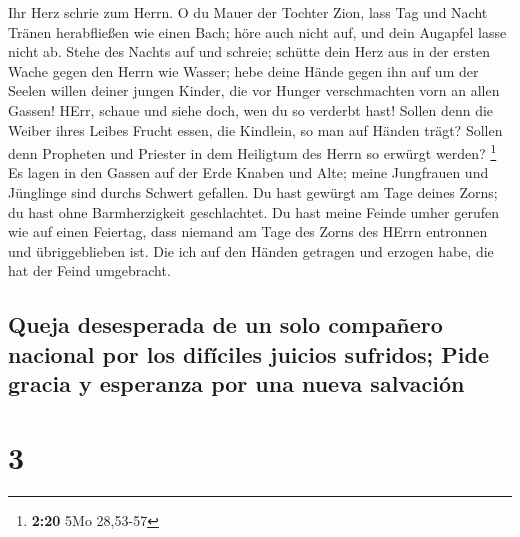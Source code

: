  Ihr Herz schrie zum Herrn. O du Mauer der Tochter Zion,
lass Tag und Nacht Tränen herabfließen wie einen Bach; höre auch nicht
auf, und dein Augapfel lasse nicht ab.  Stehe des Nachts
auf und schreie; schütte dein Herz aus in der ersten Wache gegen den
Herrn wie Wasser; hebe deine Hände gegen ihn auf um der Seelen willen
deiner jungen Kinder, die vor Hunger verschmachten vorn an allen Gassen!
 HErr, schaue und siehe doch, wen du so verderbt hast!
Sollen denn die Weiber ihres Leibes Frucht essen, die Kindlein, so man
auf Händen trägt? Sollen denn Propheten und Priester in dem Heiligtum
des Herrn so erwürgt werden? \footnote{\textbf{2:20} 5Mo 28,53-57}
 Es lagen in den Gassen auf der Erde Knaben und Alte;
meine Jungfrauen und Jünglinge sind durchs Schwert gefallen. Du hast
gewürgt am Tage deines Zorns; du hast ohne Barmherzigkeit geschlachtet.
 Du hast meine Feinde umher gerufen wie auf einen
Feiertag, dass niemand am Tage des Zorns des HErrn entronnen und
übriggeblieben ist. Die ich auf den Händen getragen und erzogen habe,
die hat der Feind umgebracht.

\hypertarget{queja-desesperada-de-un-solo-compauxf1ero-nacional-por-los-difuxedciles-juicios-sufridos-pide-gracia-y-esperanza-por-una-nueva-salvaciuxf3n}{%
\subsection{Queja desesperada de un solo compañero nacional por los
difíciles juicios sufridos; Pide gracia y esperanza por una nueva
salvación}\label{queja-desesperada-de-un-solo-compauxf1ero-nacional-por-los-difuxedciles-juicios-sufridos-pide-gracia-y-esperanza-por-una-nueva-salvaciuxf3n}}

\hypertarget{section-2}{%
\section{3}\label{section-2}}

